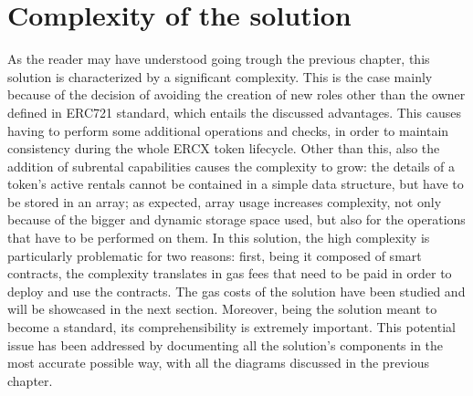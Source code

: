 \documentclass[english, LaM, oneside]{sapthesis}%
\begin{document}
\section{Complexity of the solution}
As the reader may have understood going trough the previous chapter, this solution is characterized by a significant complexity. This is the case mainly because of the decision of avoiding the creation of new roles other than the owner defined in ERC721 standard, which entails the discussed advantages. This causes having to perform some additional operations and checks, in order to maintain consistency during the whole ERCX token lifecycle. \newline
Other than this, also the addition of subrental capabilities causes the complexity to grow: the details of a token's active rentals cannot be contained in a simple data structure, but have to be stored in an array; as expected, array usage increases complexity, not only because of the bigger and dynamic storage space used, but also for the operations that have to be performed on them. \newline
In this solution, the high complexity is particularly problematic for two reasons: first, being it composed of smart contracts, the complexity translates in gas fees that need to be paid in order to deploy and use the contracts. The gas costs of the solution have been studied and will be showcased in the next section. Moreover, being the solution meant to become a standard, its comprehensibility is extremely important. This potential issue has been addressed by documenting all the solution's components in the most accurate possible way, with all the diagrams discussed in the previous chapter.
\end{document}
